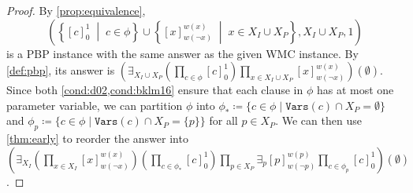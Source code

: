 \begin{proof}
  By \cref{prop:equivalence},
  \begin{equation}
    \left(\left\{[c]_0^1 \;\middle|\; c \in \phi\right\} \cup \left\{[x]_{w(\neg
          x)}^{w(x)} \;\middle|\; x \in X_I \cup X_P\right\}, X_I \cup X_P,
      1\right) \label{eq:new_wmc2}
  \end{equation}
  is a PBP instance with the same answer as the given WMC instance. By
  \cref{def:pbp}, its answer is $\left(\exists_{X_I \cup X_P} \left(\prod_{c
        \in \phi} [c]_0^1 \right) \prod_{x \in X_I \cup X_P} [x]_{w(\neg
      x)}^{w(x)} \right)(\emptyset)$. Since both \cref{cond:d02,cond:bklm16}
  ensure that each clause in $\phi$ has at most one parameter variable, we can
  partition $\phi$ into $\phi_* \coloneqq \{c \in \phi \mid \mathtt{Vars}(c)
  \cap X_P = \emptyset \}$ and $\phi_p \coloneqq \{ c \in \phi \mid
  \mathtt{Vars}(c) \cap X_P = \{ p \} \}$ for all $p \in X_P$. We can then use
  \cref{thm:early} to reorder the answer into $\left(\exists_{X_I} \left(
      \prod_{x \in X_I} [x]_{w(\neg x)}^{w(x)} \right) \left( \prod_{c \in
        \phi_*} [c]_0^1 \right) \prod_{p \in X_P} \exists_p [p]_{w(\neg
      p)}^{w(p)} \prod_{c \in \phi_p} [c]_0^1 \right)(\emptyset)$.


\end{proof}
